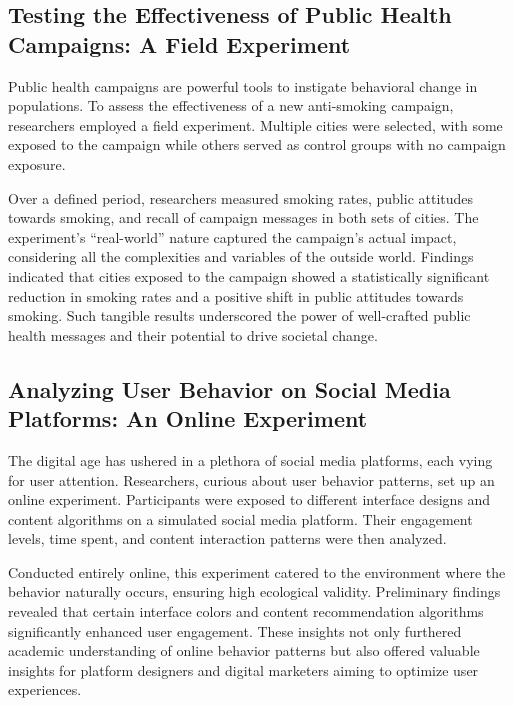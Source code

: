 \documentclass[
  b5paper]{book}
\begin{document}
\hypertarget{testing-the-effectiveness-of-public-health-campaigns-a-field-experiment}{%
\subsection*{Testing the Effectiveness of Public Health Campaigns: A Field Experiment}\label{testing-the-effectiveness-of-public-health-campaigns-a-field-experiment}}

Public health campaigns are powerful tools to instigate behavioral change in populations. To assess the effectiveness of a new anti-smoking campaign, researchers employed a field experiment. Multiple cities were selected, with some exposed to the campaign while others served as control groups with no campaign exposure.

Over a defined period, researchers measured smoking rates, public attitudes towards smoking, and recall of campaign messages in both sets of cities. The experiment's ``real-world'' nature captured the campaign's actual impact, considering all the complexities and variables of the outside world. Findings indicated that cities exposed to the campaign showed a statistically significant reduction in smoking rates and a positive shift in public attitudes towards smoking. Such tangible results underscored the power of well-crafted public health messages and their potential to drive societal change.

\hypertarget{analyzing-user-behavior-on-social-media-platforms-an-online-experiment}{%
\subsection*{Analyzing User Behavior on Social Media Platforms: An Online Experiment}\label{analyzing-user-behavior-on-social-media-platforms-an-online-experiment}}

The digital age has ushered in a plethora of social media platforms, each vying for user attention. Researchers, curious about user behavior patterns, set up an online experiment. Participants were exposed to different interface designs and content algorithms on a simulated social media platform. Their engagement levels, time spent, and content interaction patterns were then analyzed.

Conducted entirely online, this experiment catered to the environment where the behavior naturally occurs, ensuring high ecological validity. Preliminary findings revealed that certain interface colors and content recommendation algorithms significantly enhanced user engagement. These insights not only furthered academic understanding of online behavior patterns but also offered valuable insights for platform designers and digital marketers aiming to optimize user experiences.
\end{document}
